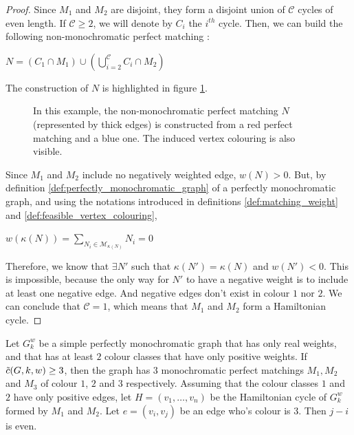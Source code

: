 \begin{proof}
    Since $M_1$ and $M_2$ are disjoint, they form a disjoint union of $\mathcal{C}$ cycles of even length. If $\mathcal{C} \geq 2$, we will denote by $C_i$ the $i^{th}$ cycle. Then, we can build the following non-monochromatic perfect matching :
    \begin{center}
        $N = (C_1 \cap M_1) \cup (\bigcup\limits_{i=2}^{\mathcal{C}} C_i \cap M_2)$
    \end{center}

    The construction of $N$ is highlighted in figure \ref{fig:demo_unique_neg_ham}.

    \begin{figure}[H]
        \caption{In this example, the non-monochromatic perfect matching $N$ (represented by thick edges) is constructed from a red perfect matching and a blue one. The induced vertex colouring is also visible.}
        \label{fig:demo_unique_neg_ham}
    \end{figure}

    Since $M_1$ and $M_2$ include no negatively weighted edge, $w(N) > 0$. But, by definition \ref{def:perfectly_monochromatic_graph} of a perfectly monochromatic graph, and using the notations introduced in definitions \ref{def:matching_weight} and \ref{def:feasible_vertex_colouring},

    \begin{center}
        $w(\kappa(N)) = \sum\limits_{N_i \in \mathcal{M}_{\kappa(N)}} N_i = 0$
    \end{center}

    Therefore, we know that $\exists N'$ such that $\kappa(N') = \kappa(N)$ and $w(N') < 0$. This is impossible, because the only way for $N'$ to have a negative weight is to include at least one negative edge. And negative edges don't exist in colour $1$ nor $2$. We can conclude that $\mathcal{C} = 1$, which means that $M_1$ and $M_2$ form a Hamiltonian cycle.
\end{proof}

\begin{observation}
    \label{obs:2_positive_classes_parity_crossing_edge}
    Let $G_k^w$ be a simple perfectly monochromatic graph that has only real weights, and that has at least $2$ colour classes that have only positive weights. If $\Tilde{c}(G, k, w) \geq 3$, then the graph has $3$ monochromatic perfect matchings $M_1, M_2$ and $M_3$ of colour $1$, $2$ and $3$ respectively. Assuming that the colour classes $1$ and $2$ have only positive edges, let $H = (v_1, \dots, v_n)$ be the Hamiltonian cycle of $G_k^w$ formed by $M_1$ and $M_2$. Let $e = (v_i, v_j)$ be an edge who's colour is $3$. Then $j-i$ is even.
\end{observation}

